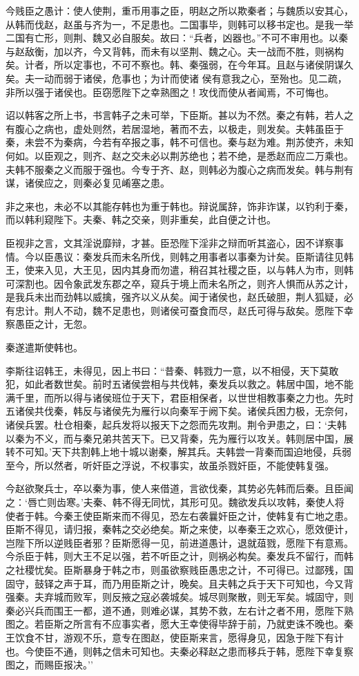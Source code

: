 \documentclass[]{article}
\begin{document}
今贱臣之愚计：使人使荆，重币用事之臣，明赵之所以欺秦者；与魏质以安其心，从韩而伐赵，赵虽与齐为一，不足患也。二国事毕，则韩可以移书定也。是我一举二国有亡形，则荆、魏又必自服矣。故曰：``兵者，凶器也。''不可不审用也。以秦与赵敌衡，加以齐，今又背韩，而未有以坚荆、魏之心。夫一战而不胜，则祸构矣。计者，所以定事也，不可不察也。韩、秦强弱，在今年耳。且赵与诸侯阴谋久矣。夫一动而弱于诸侯，危事也；为计而使诸
侯有意我之心，至殆也。见二疏，非所以强于诸侯也。臣窃愿陛下之幸熟图之！攻伐而使从者闻焉，不可悔也。

诏以韩客之所上书，书言韩子之未可举，下臣斯。甚以为不然。秦之有韩，若人之有腹心之病也，虚处则然，若居湿地，著而不去，以极走，则发矣。夫韩虽臣于秦，未尝不为秦病，今若有卒报之事，韩不可信也。秦与赵为难。荆苏使齐，未知何如。以臣观之，则齐、赵之交未必以荆苏绝也；若不绝，是悉赵而应二万乘也。夫韩不服秦之义而服于强也。今专于齐、赵，则韩必为腹心之病而发矣。韩与荆有谋，诸侯应之，则秦必复见崤塞之患。

非之来也，未必不以其能存韩也为重于韩也。辩说属辞，饰非诈谋，以钓利于秦，而以韩利窥陛下。夫秦、韩之交亲，则非重矣，此自便之计也。

臣视非之言，文其淫说靡辩，才甚。臣恐陛下淫非之辩而听其盗心，因不详察事情。今以臣愚议：秦发兵而未名所伐，则韩之用事者以事秦为计矣。臣斯请往见韩王，使来入见，大王见，因内其身而勿遣，稍召其社稷之臣，以与韩人为市，则韩可深割也。因令象武发东郡之卒，窥兵于境上而未名所之，则齐人惧而从苏之计，是我兵未出而劲韩以威擒，强齐以义从矣。闻于诸侯也，赵氏破胆，荆人狐疑，必有忠计。荆人不动，魏不足患也，则诸侯可蚕食而尽，赵氏可得与敌矣。愿陛下幸察愚臣之计，无忽。

秦遂遣斯使韩也。

李斯往诏韩王，未得见，因上书曰：``昔秦、韩戮力一意，以不相侵，天下莫敢犯，如此者数世矣。前时五诸侯尝相与共伐韩，秦发兵以救之。韩居中国，地不能满千里，而所以得与诸侯班位于天下，君臣相保者，以世世相教事秦之力也。先时五诸侯共伐秦，韩反与诸侯先为雁行以向秦军于阙下矣。诸侯兵困力极，无奈何，诸侯兵罢。杜仓相秦，起兵发将以报天下之怨而先攻荆。荆令尹患之，曰：`夫韩以秦为不义，而与秦兄弟共苦天下。已又背秦，先为雁行以攻关。韩则居中国，展转不可知。'天下共割韩上地十城以谢秦，解其兵。夫韩尝一背秦而国迫地侵，兵弱至今，所以然者，听奸臣之浮说，不权事实，故虽杀戮奸臣，不能使韩复强。

今赵欲聚兵士，卒以秦为事，使人来借道，言欲伐秦，其势必先韩而后秦。且臣闻之：`唇亡则齿寒。'夫秦、韩不得无同忧，其形可见。魏欲发兵以攻韩，秦使人将使者于韩。今秦王使臣斯来而不得见，恐左右袭曩奸臣之计，使韩复有亡地之患。臣斯不得见，请归报，秦韩之交必绝矣。斯之来使，以奉秦王之欢心，愿效便计，岂陛下所以逆贱臣者邪？臣斯愿得一见，前进道愚计，退就葅戮，愿陛下有意焉。今杀臣于韩，则大王不足以强，若不听臣之计，则祸必构矣。秦发兵不留行，而韩之社稷忧矣。臣斯暴身于韩之市，则虽欲察贱臣愚忠之计，不可得已。过鄙残，国固守，鼓铎之声于耳，而乃用臣斯之计，晚矣。且夫韩之兵于天下可知也，今又背强秦。夫弃城而败军，则反掖之寇必袭城矣。城尽则聚散，则无军矣。城固守，则秦必兴兵而围王一都，道不通，则难必谋，其势不救，左右计之者不用，愿陛下熟图之。若臣斯之所言有不应事实者，愿大王幸使得毕辞于前，乃就吏诛不晚也。秦王饮食不甘，游观不乐，意专在图赵，使臣斯来言，愿得身见，因急于陛下有计也。今使臣不通，则韩之信未可知也。夫秦必释赵之患而移兵于韩，愿陛下幸复察图之，而赐臣报决。''
\end{document}
